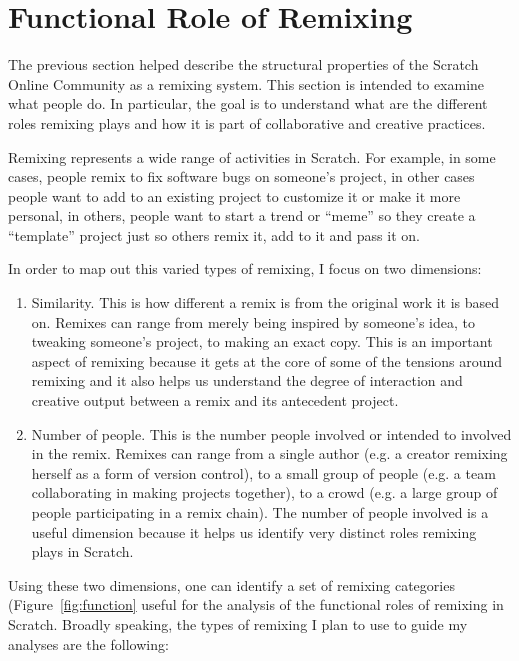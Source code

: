 \section{Functional Role of Remixing}

The previous section helped describe the structural properties of the Scratch Online Community as a remixing system.
This section is intended to examine what people do.
In particular, the goal is to understand what are the different roles remixing plays and how it is part of collaborative and creative practices.

Remixing represents a wide range of activities in Scratch.
For example, in some cases, people remix to fix software bugs on someone's project, in other cases people want to add to an existing project to customize it or make it more personal, in others, people want to start a trend or ``meme'' so they create a ``template'' project just so others remix it, add to it and pass it on.

In order to map out this varied types of remixing, I focus on two dimensions:
\begin{enumerate}
\item{Similarity}. This is how different a remix is from the original work it is based on. 
Remixes can range from merely being inspired by someone's idea, to tweaking someone's project, to making an exact copy.
This is an important aspect of remixing because it gets at the core of some of the tensions around remixing and it also helps us understand the degree of interaction and creative output between a remix and its antecedent project.
\item{Number of people}. This is the number people involved or intended to involved in the remix.
Remixes can range from a single author (e.g. a creator remixing herself as a form of version control), to a small group of people (e.g. a team collaborating in making projects together), to a crowd (e.g. a large group of people participating in a remix chain).
The number of people involved is a useful dimension because it helps us identify very distinct roles remixing plays in Scratch.
\end{enumerate}

Using these two dimensions, one can identify a set of remixing categories (Figure~\ref{fig:function} useful for the analysis of the functional roles of remixing in Scratch.
Broadly speaking, the types of remixing I plan to use to guide my analyses are the following:

